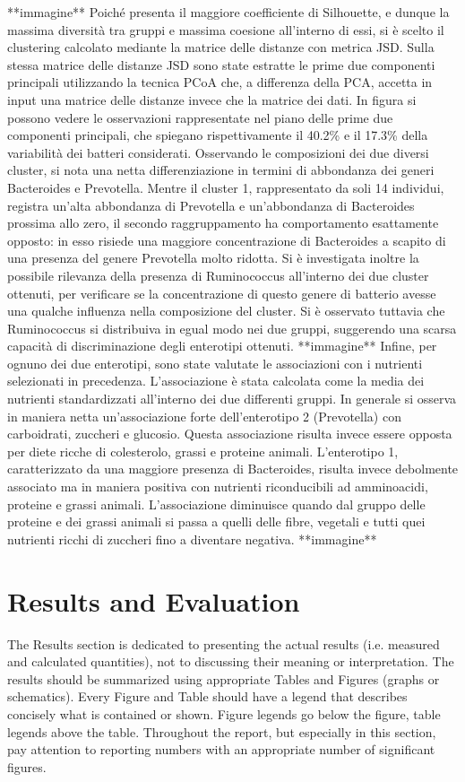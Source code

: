 **immagine**
Poiché presenta il maggiore coefficiente di Silhouette, e dunque la massima diversità tra gruppi e massima coesione all’interno di essi, si è scelto il clustering calcolato mediante la matrice delle distanze con metrica JSD. 
Sulla stessa matrice delle distanze JSD sono state estratte le prime due componenti principali utilizzando la tecnica PCoA che, a differenza della PCA, accetta in input una matrice delle distanze invece che la matrice dei dati. In figura si possono vedere le osservazioni rappresentate nel piano delle prime due componenti principali, che spiegano rispettivamente il 40.2\% e il 17.3\% della variabilità dei batteri considerati. Osservando le composizioni dei due diversi cluster, si nota una netta differenziazione in termini di abbondanza dei generi Bacteroides e Prevotella. Mentre il cluster 1, rappresentato da soli 14 individui, registra un’alta abbondanza di Prevotella e un'abbondanza di Bacteroides prossima allo zero, il secondo raggruppamento ha comportamento esattamente opposto: in esso risiede una maggiore concentrazione di Bacteroides a scapito di una presenza del genere Prevotella molto ridotta.
Si è investigata inoltre la possibile rilevanza della presenza di Ruminococcus all’interno dei due cluster ottenuti, per verificare se la concentrazione di questo genere di batterio avesse una qualche influenza nella composizione del cluster. Si è osservato tuttavia che Ruminococcus si distribuiva in egual modo nei due gruppi, suggerendo una scarsa capacità di discriminazione degli enterotipi ottenuti.
**immagine**
Infine, per ognuno dei due enterotipi, sono state valutate le associazioni con i nutrienti selezionati in precedenza. L’associazione è stata calcolata come la media dei nutrienti standardizzati all’interno dei due differenti gruppi.
In generale si osserva in maniera netta un'associazione forte dell’enterotipo 2 (Prevotella) con carboidrati, zuccheri e glucosio. Questa associazione risulta invece essere opposta per diete ricche di colesterolo, grassi e proteine animali. L’enterotipo 1, caratterizzato da una maggiore presenza di Bacteroides, risulta invece debolmente associato ma in maniera positiva con nutrienti riconducibili ad amminoacidi, proteine e grassi animali. L’associazione diminuisce quando dal gruppo delle proteine e dei grassi animali si passa a quelli delle fibre, vegetali e tutti quei nutrienti ricchi di zuccheri fino a diventare negativa.
**immagine**



\section{Results and Evaluation}
The Results section is dedicated to presenting the actual results (i.e. measured and calculated quantities), not to discussing their meaning or interpretation. The results should be summarized using appropriate Tables and Figures (graphs or schematics). Every Figure and Table should have a legend that describes concisely what is contained or shown. Figure legends go below the figure, table legends above the table. Throughout the report, but especially in this section, pay attention to reporting numbers with an appropriate number of significant figures. 

